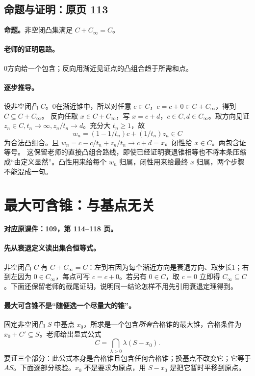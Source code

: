 \subsection{命题与证明：原页 113}

\textbf{命题。}非空闭凸集满足 $C+C_\infty=C$。

\paragraph{老师的证明思路。}0方向给一个包含；反向用渐近见证点的凸组合趋于所需和点。

\paragraph{逐步推导。}
设非空闭凸 $C$。0在渐近锥中，所以对任意 $c\in C$，$c=c+0\in C+C_\infty$，得到 $C\subseteq C+C_\infty$。
反向任取 $x\in C+C_\infty$，写 $x=c+d$，$c\in C,d\in C_\infty$。取方向见证 $z_n\in C,t_n\to\infty,z_n/t_n\to d$。充分大 $t_n\ge1$，故
\[w_n=(1-1/t_n)c+(1/t_n)z_n\in C\]
为合法凸组合。且 $w_n=c-c/t_n+z_n/t_n\to c+d=x$。闭性给 $x\in C$。两包含证等号。
这保留老师的直接凸组合路线，即使已经证明衰退锥相等也不将本条压缩成“由定义显然”。凸性用来给每个 $w_n$ 归属，闭性用来给最终 $x$ 归属，两个步骤不能混成一句。


\clearpage\section{最大可含锥：与基点无关}\label{g:109:114}

\textbf{对应原课件：109，第 114--118 页。}


\paragraph{先从衰退定义读出集合恒等式。}
非空闭凸 $C$ 有 $C+C_\infty=C$：左到右因为每个渐近方向是衰退方向、取步长1；右到左因为 $0\in C_\infty$，每点可写 $c=c+0$。若另有 $0\in C$，取 $c=0$ 立即得 $C_\infty\subseteq C$。下面还保留老师的截尾证明，说明同一结论怎样不用先引用衰退定理得到。
\paragraph{最大可含锥不是“随便选一个尽量大的锥”。}
固定非空闭凸 $S$ 中基点 $x_0$，所求是一个包含\emph{所有}合格锥的最大锥，合格条件为 $x_0+C'\subseteq S$。老师给出显式公式
\[C=\bigcap_{\lambda>0}\lambda(S-x_0).
\]
要证三个部分：此公式本身是合格锥且包含任何合格锥；换基点不改变它；它等于 $AS$。下面逐部分核验。$x_0$ 不是要求为原点，用 $S-x_0$ 是把它暂时平移到原点。


